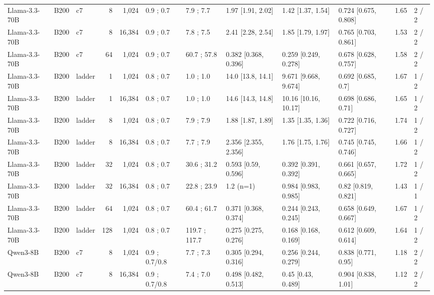 \begin{landscape}
\begin{longtable}{lllrrlllllrl}
\midrule
\endhead
\bottomrule
\endfoot
Llama-3.3-70B & B200 & c7 & 8 & 1,024 & 0.9 ; 0.7 & 7.9 ; 7.7 & 1.97 {[}1.91, 2.02{]} & 1.42 {[}1.37, 1.54{]} & 0.724 {[}0.675, 0.808{]} & 1.65 & 2 / 2 \\
Llama-3.3-70B & B200 & c7 & 8 & 16,384 & 0.9 ; 0.7 & 7.8 ; 7.5 & 2.41 {[}2.28, 2.54{]} & 1.85 {[}1.79, 1.97{]} & 0.765 {[}0.703, 0.861{]} & 1.53 & 2 / 2 \\
Llama-3.3-70B & B200 & c7 & 64 & 1,024 & 0.9 ; 0.7 & 60.7 ; 57.8 & 0.382 {[}0.368, 0.396{]} & 0.259 {[}0.249, 0.278{]} & 0.678 {[}0.628, 0.757{]} & 1.58 & 2 / 2 \\
Llama-3.3-70B & B200 & ladder & 1 & 1,024 & 0.8 ; 0.7 & 1.0 ; 1.0 & 14.0 {[}13.8, 14.1{]} & 9.671 {[}9.668, 9.674{]} & 0.692 {[}0.685, 0.7{]} & 1.67 & 1 / 2 \\
Llama-3.3-70B & B200 & ladder & 1 & 16,384 & 0.8 ; 0.7 & 1.0 ; 1.0 & 14.6 {[}14.3, 14.8{]} & 10.16 {[}10.16, 10.17{]} & 0.698 {[}0.686, 0.71{]} & 1.65 & 1 / 2 \\
Llama-3.3-70B & B200 & ladder & 8 & 1,024 & 0.8 ; 0.7 & 7.9 ; 7.9 & 1.88 {[}1.87, 1.89{]} & 1.35 {[}1.35, 1.36{]} & 0.722 {[}0.716, 0.727{]} & 1.74 & 1 / 2 \\
Llama-3.3-70B & B200 & ladder & 8 & 16,384 & 0.8 ; 0.7 & 7.7 ; 7.9 & 2.356 {[}2.355, 2.356{]} & 1.76 {[}1.75, 1.76{]} & 0.745 {[}0.745, 0.746{]} & 1.66 & 1 / 2 \\
Llama-3.3-70B & B200 & ladder & 32 & 1,024 & 0.8 ; 0.7 & 30.6 ; 31.2 & 0.593 {[}0.59, 0.596{]} & 0.392 {[}0.391, 0.392{]} & 0.661 {[}0.657, 0.665{]} & 1.72 & 1 / 2 \\
Llama-3.3-70B & B200 & ladder & 32 & 16,384 & 0.8 ; 0.7 & 22.8 ; 23.9 & 1.2 (n=1) & 0.984 {[}0.983, 0.985{]} & 0.82 {[}0.819, 0.821{]} & 1.43 & 1 / 1 \\
Llama-3.3-70B & B200 & ladder & 64 & 1,024 & 0.8 ; 0.7 & 60.4 ; 61.7 & 0.371 {[}0.368, 0.374{]} & 0.244 {[}0.243, 0.245{]} & 0.658 {[}0.649, 0.667{]} & 1.67 & 1 / 2 \\
Llama-3.3-70B & B200 & ladder & 128 & 1,024 & 0.8 ; 0.7 & 119.7 ; 117.7 & 0.275 {[}0.275, 0.276{]} & 0.168 {[}0.168, 0.169{]} & 0.612 {[}0.609, 0.614{]} & 1.64 & 1 / 2 \\
Qwen3-8B & B200 & c7 & 8 & 1,024 & 0.9 ; 0.7/0.8 & 7.7 ; 7.3 & 0.305 {[}0.294, 0.316{]} & 0.256 {[}0.244, 0.279{]} & 0.838 {[}0.771, 0.95{]} & 1.18 & 2 / 2 \\
Qwen3-8B & B200 & c7 & 8 & 16,384 & 0.9 ; 0.7/0.8 & 7.4 ; 7.0 & 0.498 {[}0.482, 0.513{]} & 0.45 {[}0.43, 0.489{]} & 0.904 {[}0.838, 1.01{]} & 1.12 & 2 / 2 \\

\end{longtable}
\end{landscape}
